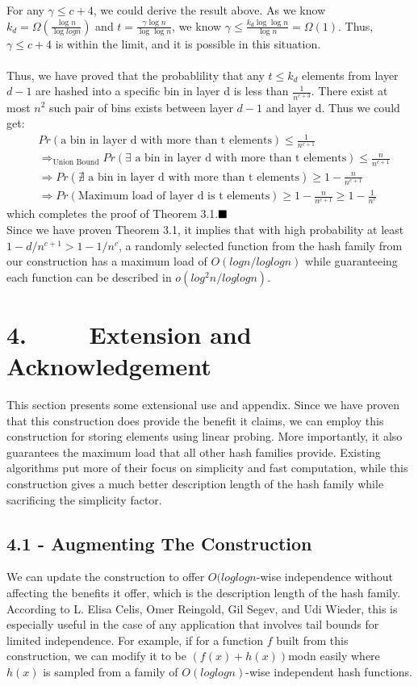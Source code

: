 \documentclass[a4paper, english]{paper}
\begin{document}
For any $\gamma\le c+4$, we could derive the result above. As we know $k_d = \Omega(\frac{\log n}{\log log n})$ and $t = \frac{\gamma\log n}{\log\log n}$, we know $\gamma\le \frac{k_d\log\log n}{\log n} = \Omega(1)$. Thus, $\gamma\le c+4$ is within the limit, and it is possible in this situation.\\\\
Thus, we have proved that the probablility that any $t\le k_d$ elements from layer $d-1$ are hashed into a specific bin in layer d is less than $\frac{1}{n^{c+3}}$. There exist at most $n^2$ such pair of bins exists between layer $d-1$ and layer d. Thus we could get:
\begin{align*}
&Pr(\text{a bin in layer d with more than t elements})\le\frac1{n^{c+1}}\\
&\Rightarrow_{\text{Union Bound}} Pr(\exists\text{ a bin in layer d with more than t elements})\le\frac n{n^{c+1}}\\
&\Rightarrow Pr(\nexists\text{ a bin in layer d with more than t elements})\ge 1-\frac n{n^{c+1}}\\
&\Rightarrow Pr(\text{Maximum load of layer d is t elements})\ge 1-\frac n{n^{c+1}}\ge 1-\frac1{n^c}
\end{align*}
which completes the proof of Theorem 3.1.$\hfill\blacksquare$ \\

Since we have proven Theorem 3.1, it implies that with high probability at least $1-d/n^{c+1} > 1-1/n^c$, a randomly selected function from the hash family from our construction has a maximum load of $O(logn/loglogn)$ while guaranteeing each function can be described in $o(log^2 n/loglogn)$. 


	 \section{4. $\qquad$ Extension and Acknowledgement}
	 This section presents some extensional use and appendix. Since we have proven that this construction does provide the benefit it claims, we can employ this construction for storing elements using linear probing. More importantly, it also guarantees the maximum load that all other hash families provide. Existing algorithms put more of their focus on simplicity and fast computation, while this construction gives a much better description length of the hash family while sacrificing the simplicity factor.
	 
	 \subsection{4.1 - Augmenting The Construction} 
	 We can update the construction to offer $O(loglogn$-wise independence without affecting the benefits it offer, which is the description length of the hash family. According to L. Elisa Celis, Omer Reingold, Gil Segev, and Udi Wieder, this is especially useful in the case of any application that involves tail bounds for limited independence. For example, if for a function $f$ built from this construction, we can modify it to be $(f(x)+h(x))$modn easily where $h(x)$ is sampled from a family of $O(loglogn)$-wise independent hash functions. 
	 
\end{document}
